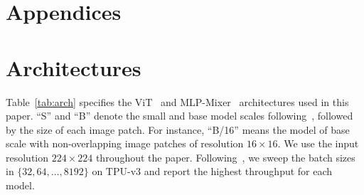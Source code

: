 \appendix

\section*{Appendices}


\section{Architectures}
Table~\ref{tab:arch} specifies the ViT~\cite{dosovitskiy2021an,vaswani2017attention} and MLP-Mixer~\cite{tolstikhin2021mlpmixer} architectures used in this paper.
``S'' and ``B'' denote the small and base model scales following~\cite{dosovitskiy2021an, touvron2021training, tolstikhin2021mlpmixer}, followed by the size of each image patch.
For instance, ``B/16'' means the model of base scale with non-overlapping image patches of resolution $16\times 16$.
We use the input resolution $224\times 224$ throughout the paper. 
Following~\citet{tolstikhin2021mlpmixer}, we sweep the batch sizes in $\{32, 64, \dots, 8192\}$ on TPU-v3 and report the highest throughput for each model.



